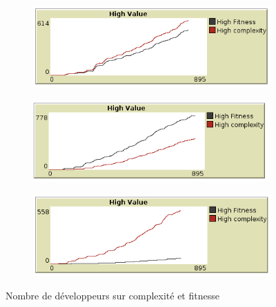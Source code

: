 \documentclass{article}
\begin{document}
\begin{figure}[H]

  \begin{subfigure}{.5\textwidth}
    \centering
    \includegraphics[width=1\linewidth]{pictures/seuil5_complexite_fitness.png}
  \end{subfigure}
  \begin{subfigure}{.5\textwidth}
    \centering
    \includegraphics[width=1\linewidth]{pictures/seuil_complexite10_fitness5.png}
  \end{subfigure}
  \begin{subfigure}{.5\textwidth}
    \centering
    \includegraphics[width=1\linewidth]{pictures/seuil_complexite5_fitness8.png}
  \end{subfigure}

  \caption{Nombre de développeurs sur complexité et fitnesse }
\end{figure}
\end{document}
